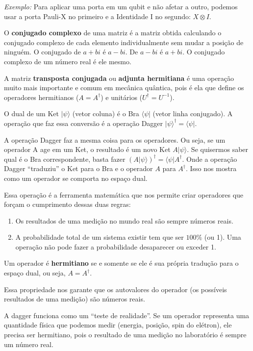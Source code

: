 \documentclass[12pt, a4paper]{article}
\newcommand{\ket}[1]{\lvert #1 \rangle}
\newcommand{\bra}[1]{\langle #1 \rvert}
\begin{document}
\textit{Exemplo:} Para aplicar uma porta em um qubit e não afetar a outro, podemos usar a porta Pauli-X no primeiro e a Identidade I no segundo: $X \otimes I$.

O \textbf{conjugado complexo} de uma matriz é a matriz obtida calculando o conjugado complexo de cada elemento individualmente sem mudar a posição de ninguém. O conjugado de \(a+bi\) é \(a-bi\). De \(a-bi\) é \(a+bi\). O conjugado complexo de um número real é ele mesmo.

A matriz \textbf{transposta conjugada} ou \textbf{adjunta hermitiana} é uma operação muito mais importante e comum em mecânica quântica, pois é ela que define os operadores hermitianos (\(A=A^\dagger\)) e unitários (\(U^\dagger = U^{-1}\)).

O dual de um Ket $\ket{\psi}$ (vetor coluna) é o Bra $\bra{\psi}$ (vetor linha conjugado). A operação que faz essa conversão é a operação Dagger \(\ket{\psi}^\dagger = \bra{\psi}\).

A operação Dagger faz a mesma coisa para os operadores. Ou seja, se um operador A age em um Ket, o resultado é um novo Ket $A\ket{\psi}$. Se quisermos saber qual é o Bra correspondente, basta fazer \((A\ket{\psi})^\dagger = \bra{\psi}A^\dagger\). Onde a operação Dagger ``traduziu'' o Ket para o Bra e o operador $A$ para $A^\dagger$. Isso nos mostra como um operador se comporta no espaço dual.

Essa operação é a ferramenta matemática que nos permite criar operadores que forçam o cumprimento dessas duas regras:
\begin{enumerate}
    \item Os resultados de uma medição no mundo real são sempre números reais.
    \item A probabilidade total de um sistema existir tem que ser $100\%$ (ou 1). Uma operação não pode fazer a probabilidade desaparecer ou %
    exceder 1.
\end{enumerate}

Um operador é \textbf{hermitiano} se e somente se ele é sua própria tradução para o espaço dual, ou seja, $A = A^\dagger$.

Essa propriedade nos garante que os autovalores do operador (os possíveis resultados de uma medição) são números reais.

A dagger funciona como um ``teste de realidade''. Se um operador representa  uma quantidade física que podemos medir (energia, posição, spin do elétron), ele precisa ser hermitiano, pois o resultado de uma medição no laboratório é sempre um número real.
\end{document}
